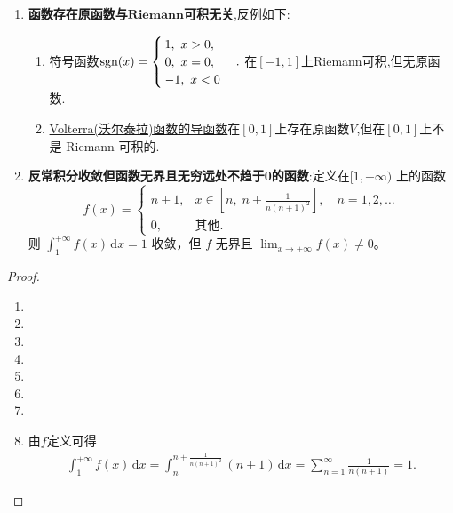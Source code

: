 \documentclass[../../main.tex]{subfiles}%
\begin{document}
\begin{proposition}[常见反例]
\begin{enumerate}
\item \textbf{函数存在原函数与}$\mathbf{Riemann}$\textbf{可积无关},反例如下:
\begin{enumerate}[(1)]
\item 符号函数$\operatorname{sgn}(x)=
\begin{cases}
1,\ x>0,\\
0,\ x=0,\\
-1,\ x<0
\end{cases}.$
在$[-1,1]$上Riemann可积,但无原函数.

\item \hyperref[Real-Analysis-theorem:Volterra函数的基本性质]{Volterra(沃尔泰拉)函数的导函数}在$[0,1]$上存在原函数$V$,但在$[0,1]$上不是 Riemann 可积的.
\end{enumerate}

\item \textbf{反常积分收敛但函数无界且无穷远处不趋于0的函数}:定义在\([1,+\infty)\) 上的函数
\[
f(x)=\begin{cases}
n+1, & x\in\left[n,\; n+\frac{1}{n(n+1)^2}\right],\quad n=1,2,\dots\\
0, & \text{其他}.
\end{cases}
\]
则 \(\int_1^{+\infty}f(x)\,\mathrm{d}x=1\) 收敛，但 \(f\) 无界且 \(\lim_{x\to+\infty}f(x)\neq0\)。
\end{enumerate}
\end{proposition}
\begin{proof}
\begin{enumerate}
\item 

\item 

\item 

\item 

\item 

\item 

\item 

\item 由$f$定义可得
\begin{align*}
\int_1^{+\infty}f(x)\,\mathrm{d}x=\int_{n}^{n+\frac{1}{n(n+1)^2}}(n+1)\,\mathrm{d}x=\sum_{n=1}^{\infty}\frac{1}{n(n+1)}=1.
\end{align*}
\end{enumerate}
\end{proof}
\end{document}
